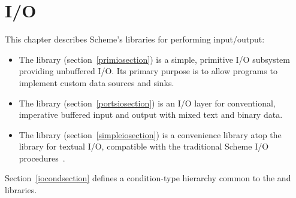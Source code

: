 \chapter{I/O}
\label{iochapter}

This chapter describes Scheme's libraries for performing input/output:

\begin{itemize}
\item The  library
  (section~\ref{primiosection}) is a simple, primitive I/O
  subsystem providing unbuffered I/O.  Its primary purpose is to allow
  programs to implement custom data sources and sinks.
\item The  library
  (section~\ref{portsiosection}) is an I/O layer for conventional,
  imperative buffered input and output with mixed text and binary
  data.
\item The  library
  (section~\ref{simpleiosection}) is a convenience library atop the
   library for textual I/O, compatible with 
  the traditional Scheme I/O procedures~\cite{R5RS}.
\end{itemize}

Section~\ref{iocondsection} defines a condition-type hierarchy common
to the  and 
libraries.






